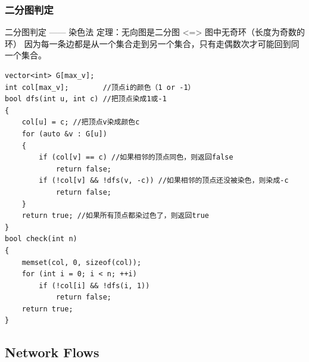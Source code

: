 \documentclass[twoside]{article}
\begin{document}
\subsubsection{二分图判定}
二分图判定 —— 染色法
定理：无向图是二分图 <=> 图中无奇环（长度为奇数的环）
因为每一条边都是从一个集合走到另一个集合，只有走偶数次才可能回到同一个集合。
\begin{lstlisting}
vector<int> G[max_v];
int col[max_v];        //顶点i的颜色（1 or -1）
bool dfs(int u, int c) //把顶点染成1或-1
{
    col[u] = c; //把顶点v染成颜色c
    for (auto &v : G[u])
    {
        if (col[v] == c) //如果相邻的顶点同色，则返回false
            return false;
        if (!col[v] && !dfs(v, -c)) //如果相邻的顶点还没被染色，则染成-c
            return false;
    }
    return true; //如果所有顶点都染过色了，则返回true
}
bool check(int n)
{
    memset(col, 0, sizeof(col));
    for (int i = 0; i < n; ++i)
        if (!col[i] && !dfs(i, 1))
            return false;
    return true;
}
\end{lstlisting}
\subsection{Network Flows}
\end{document}
